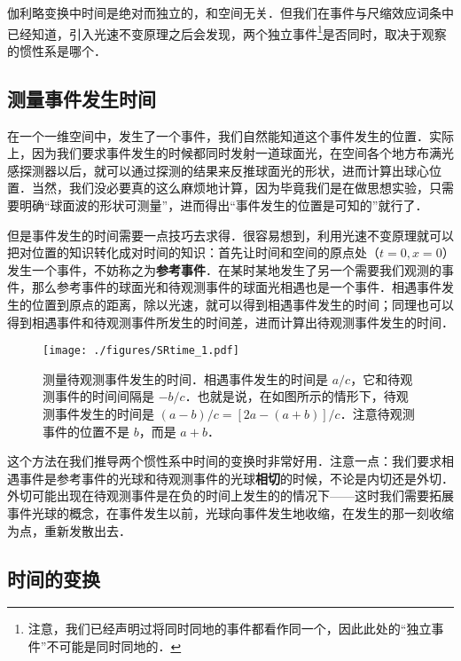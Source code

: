 

伽利略变换中时间是绝对而独立的，和空间无关．但我们在事件与尺缩效应词条中已经知道，引入光速不变原理之后会发现，两个独立事件\footnote{注意，我们已经声明过将同时同地的事件都看作同一个，因此此处的“独立事件”不可能是同时同地的．}是否同时，取决于观察的惯性系是哪个．

\subsection{测量事件发生时间}

在一个一维空间中，发生了一个事件，我们自然能知道这个事件发生的位置．实际上，因为我们要求事件发生的时候都同时发射一道球面光，在空间各个地方布满光感探测器以后，就可以通过探测的结果来反推球面光的形状，进而计算出球心位置．当然，我们没必要真的这么麻烦地计算，因为毕竟我们是在做思想实验，只需要明确“球面波的形状可测量”，进而得出“事件发生的位置是可知的”就行了．

但是事件发生的时间需要一点技巧去求得．很容易想到，利用光速不变原理就可以把对位置的知识转化成对时间的知识：首先让时间和空间的原点处（$t=0, x=0$）发生一个事件，不妨称之为\textbf{参考事件}．在某时某地发生了另一个需要我们观测的事件，那么参考事件的球面光和待观测事件的球面光相遇也是一个事件．相遇事件发生的位置到原点的距离，除以光速，就可以得到相遇事件发生的时间；同理也可以得到相遇事件和待观测事件所发生的时间差，进而计算出待观测事件发生的时间．

\begin{figure}[ht]
\centering
\texttt{[image: ./figures/SRtime\_1.pdf]}
\caption{测量待观测事件发生的时间．相遇事件发生的时间是 $a/c$，它和待观测事件的时间间隔是 $-b/c$．也就是说，在如图所示的情形下，待观测事件发生的时间是 $(a-b)/c=[2a-(a+b)]/c$．注意待观测事件的位置不是 $b$，而是 $a+b$．} \label{SRtime_fig1}
\end{figure}

这个方法在我们推导两个惯性系中时间的变换时非常好用．注意一点：我们要求相遇事件是参考事件的光球和待观测事件的光球\textbf{相切}的时候，不论是内切还是外切．外切可能出现在待观测事件是在负的时间上发生的的情况下——这时我们需要拓展事件光球的概念，在事件发生以前，光球向事件发生地收缩，在发生的那一刻收缩为点，重新发散出去．

\subsection{时间的变换}

